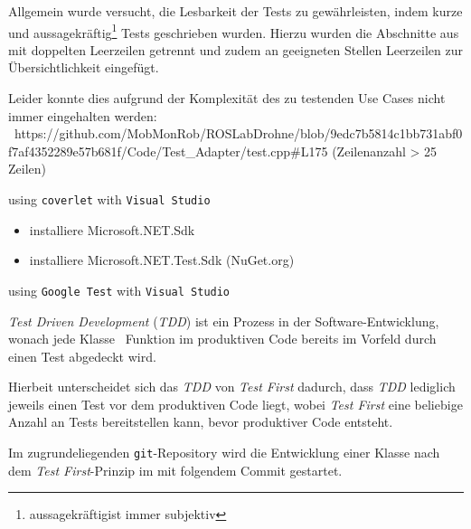 Allgemein wurde versucht, die Lesbarkeit der Tests zu gewährleisten, indem kurze und aussagekräftig\footnote{\grq aussagekräftig\glq ist immer subjektiv} Tests geschrieben wurden.
Hierzu wurden die Abschnitte aus  mit doppelten Leerzeilen getrennt und zudem an geeigneten Stellen Leerzeilen zur Übersichtlichkeit eingefügt.

Leider konnte dies aufgrund der Komplexität des zu testenden Use Cases nicht immer eingehalten werden:
\zB\ https://github.com/MobMonRob/ROSLabDrohne/blob/9edc7b5814c1bb731abf0f7af4352289e57b681f/Code/Test\_Adapter/test.cpp\#L175 (Zeilenanzahl > 25 Zeilen)










using \texttt{coverlet} with \texttt{Visual Studio}



\begin{itemize}
\item installiere Microsoft.NET.Sdk
\item installiere Microsoft.NET.Test.Sdk (NuGet.org)



\end{itemize}


using \texttt{Google Test} with \texttt{Visual Studio}






\textit{Test Driven Development} (\textit{TDD}) ist ein Prozess in der Software-Entwicklung, wonach jede Klasse \bzw\ Funktion im produktiven Code bereits im Vorfeld durch einen Test abgedeckt wird.

Hierbeit unterscheidet sich das \textit{TDD} von \textit{Test First} dadurch, dass \textit{TDD} lediglich jeweils einen Test vor dem produktiven Code liegt, wobei \textit{Test First} eine beliebige Anzahl an Tests bereitstellen kann, bevor produktiver Code entsteht.

Im zugrundeliegenden \texttt{git}-Repository wird die Entwicklung einer Klasse nach dem \textit{Test First}-Prinzip im  mit folgendem Commit gestartet.

